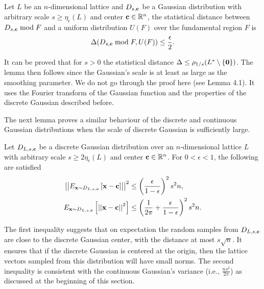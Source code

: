 \documentclass[../main.tex]{subfiles}
\begin{document}
\begin{lemma}
\label{lm:nearUniform}
\reversemarginpar
{}
Let $L$ be an $n$-dimensional lattice and $D_{s,\mathbf{c}}$ be a Gaussian distribution with arbitrary scale $s \ge \eta_{\epsilon}(L)$ and center $\mathbf{c} \in \mathbb{R}^n$, the statistical distance between $D_{s,\mathbf{c}} \bmod F$ and a uniform distribution $U(F)$ over the fundamental region $F$ is 
\begin{equation*}
    \Delta(D_{s,\mathbf{c}} \bmod F, U(F)) \le \frac{\epsilon}{2} .
\end{equation*}
\end{lemma}

It can be proved that for $s>0$ the statistical distance $\Delta \le \rho_{1/s}(L^* \setminus \{\mathbf{0}\})$. The lemma then follows since the Gaussian's scale is at least as large as the smoothing parameter. We do not go through the proof here (see \citep{micciancio07worst} Lemma 4.1). It uses the Fourier transform of the Gaussian function and the properties of the discrete Gaussian described before.  

The next lemma proves a similar behaviour of the discrete and continuous Gaussian distributions when the scale of discrete Gaussian is sufficiently large. 

\begin{lemma}
\reversemarginpar
{}
Let $D_{L, s,\mathbf{c}}$ be a discrete Gaussian distribution over an $n$-dimensional lattice $L$ with arbitrary scale $s \ge 2\eta_{\epsilon}(L)$ and center $\mathbf{c} \in \mathbb{R}^n$. For $0 < \epsilon < 1$, the following are satisfied
\begin{align*}
    \left|\left|E_{\mathbf{x} \sim D_{L, s, \mathbf{c}}}\left[\mathbf{x}-\mathbf{c}\right] \right|\right|^2 &\le \left(\frac{\epsilon}{1-\epsilon}\right)^2 s^2 n,  \\
    E_{\mathbf{x} \sim D_{L, s, \mathbf{c}}}\left[\left|\left|\mathbf{x}-\mathbf{c}\right|\right|^2\right] &\le \left(\frac{1}{2\pi}+\frac{\epsilon}{1-\epsilon}\right)^2 s^2 n.
\end{align*}
\end{lemma}
The first inequality suggests that on expectation the random samples from $D_{L,s,\mathbf{c}}$ are close to the discrete Gaussian center, with the distance at most $s\sqrt{n}$. It ensures that if the discrete Gaussian is centered at the origin, then the lattice vectors sampled from this distribution will have small norms. The second inequality is consistent with the continuous Gaussian's variance (i.e., $\frac{ns^2}{2\pi}$) as discussed at the beginning of this section.
\end{document}
